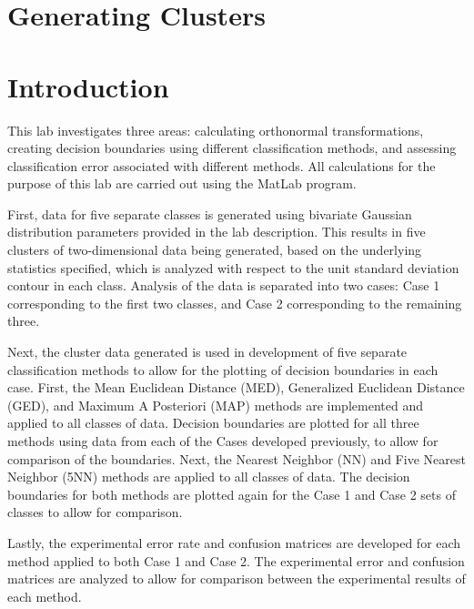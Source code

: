 \section{Generating Clusters}

\section{Introduction}
This lab investigates three areas: calculating orthonormal transformations, creating decision boundaries using different classification methods, and assessing classification error associated with different methods. All calculations for the purpose of this lab are carried out using the MatLab program.

First, data for five separate classes is generated using bivariate Gaussian distribution parameters provided in the lab description. This results in five clusters of two-dimensional data being generated, based on the underlying statistics specified, which is analyzed with respect to the unit standard deviation contour in each class. Analysis of the data is separated into two cases: Case 1 corresponding to the first two classes, and Case 2 corresponding to the remaining three.

Next, the cluster data generated is used in development of five separate classification methods to allow for the plotting of decision boundaries in each case. First, the Mean Euclidean Distance (MED), Generalized Euclidean Distance (GED), and Maximum A Posteriori (MAP) methods are implemented and applied to all classes of data. Decision boundaries are plotted for all three methods using data from each of the Cases developed previously, to allow for comparison of the boundaries. Next, the Nearest Neighbor (NN) and Five Nearest Neighbor (5NN) methods are applied to all classes of data. The decision boundaries for both methods are plotted again for the Case 1 and Case 2 sets of classes to allow for comparison.

Lastly, the experimental error rate and confusion matrices are developed for each method applied to both Case 1 and Case 2. The experimental error and confusion matrices are analyzed to allow for comparison between the experimental results of each method.
